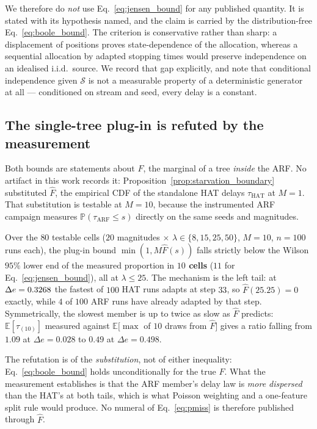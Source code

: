 We therefore do \emph{not} use Eq.~\eqref{eq:jensen_bound} for any published quantity. It is stated
with its hypothesis named, and the claim is carried by the distribution-free
Eq.~\eqref{eq:boole_bound}. The criterion is conservative rather than sharp: a displacement of
positions proves state-dependence of the allocation, whereas a sequential allocation by adapted
stopping times would preserve independence on an idealised i.i.d.\ source. We record that gap
explicitly, and note that conditional independence given $\mathcal{S}$ is not a measurable property
of a deterministic generator at all --- conditioned on stream and seed, every delay is a constant.

\subsection{The single-tree plug-in is refuted by the measurement}\label{sec:dep_plugin}

Both bounds are statements about $F$, the marginal of a tree \emph{inside} the ARF. No artifact in
this work records it: Proposition~\ref{prop:starvation_boundary} substituted $\widehat{F}$, the
empirical CDF of the standalone HAT delays $\tau_{\mathrm{HAT}}$ at $M = 1$. That substitution is
testable at $M = 10$, because the instrumented ARF campaign measures
$\mathbb{P}(\tau_{\mathrm{ARF}} \le s)$ directly on the same seeds and magnitudes.

\begin{empresult}\label{res:plugin_refuted}
  Over the $80$ testable cells ($20$ magnitudes $\times$ $\lambda \in \{8, 15, 25, 50\}$, $M = 10$,
  $n = 100$ runs each), the plug-in bound $\min(1, M\widehat{F}(s))$ falls strictly below the Wilson
  $95\%$ lower end of the measured proportion in \textbf{$10$ cells} ($11$ for
  Eq.~\eqref{eq:jensen_bound}), all at $\lambda \le 25$. The mechanism is the left tail: at
  $\Delta e = 0.3268$ the fastest of $100$ HAT runs adapts at step $33$, so
  $\widehat{F}(25.25) = 0$ exactly, while $4$ of $100$ ARF runs have already adapted by that step.
  Symmetrically, the slowest member is up to twice as slow as $\widehat{F}$ predicts:
  $\mathbb{E}[\tau_{(10)}]$ measured against $\mathbb{E}[\max$ of $10$ draws from $\widehat{F}]$
  gives a ratio falling from $1.09$ at $\Delta e = 0.028$ to $0.49$ at $\Delta e = 0.498$.
\end{empresult}

The refutation is of the \emph{substitution}, not of either inequality:
Eq.~\eqref{eq:boole_bound} holds unconditionally for the true $F$. What the measurement establishes
is that the ARF member's delay law is \emph{more dispersed} than the HAT's at both tails, which is
what Poisson weighting and a one-feature split rule would produce. No numeral of Eq.~\eqref{eq:pmiss} is therefore published through $\widehat{F}$.

